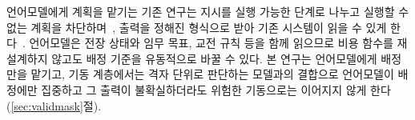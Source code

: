 언어모델에게 계획을 맡기는 기존 연구는 지시를 실행 가능한 단계로 나누고 실행할 수 없는 계획을
차단하며~\citep{huang2022zeroshot, ahn2022saycan}, 출력을 정해진 형식으로 받아 기존 시스템이 읽을
수 있게 한다~\citep{openai2026function}. 언어모델은 전장 상태와 임무 목표, 교전 규칙 등을 함께
읽으므로 비용 함수를 재설계하지 않고도 배정 기준을 유동적으로 바꿀 수 있다. 본 연구는
언어모델에게 배정만을 맡기고, 기동 계층에서는 격자 단위로 판단하는 모델과의 결합으로 언어모델이
배정에만 집중하고 그 출력이 불확실하더라도 위험한 기동으로는 이어지지 않게 한다(\ref{sec:validmask}절).
